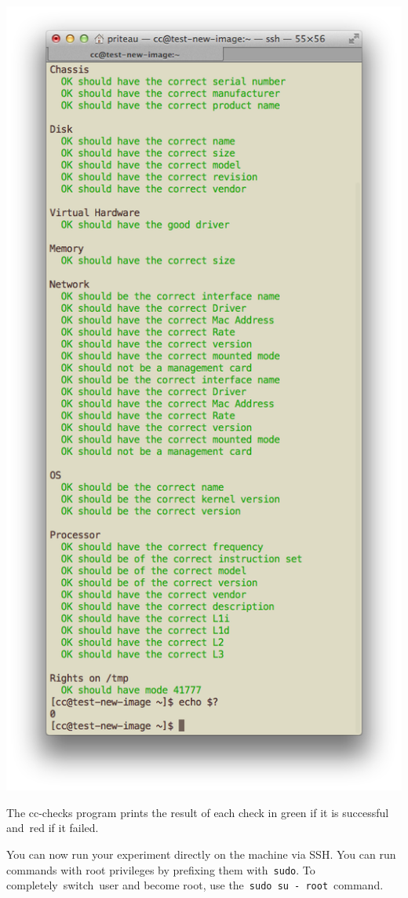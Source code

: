 \includegraphics[width=\columnwidth]{images/chameleon/cc-checks.png}

The cc-checks program prints the result of each check in green if it is
successful and~red if it failed.

You can now run your experiment directly on the machine via SSH. You can
run commands with root privileges by prefixing them with~\texttt{sudo}.
To completely~switch~user and become root, use
the~\texttt{sudo\ su\ -\ root}~command.

